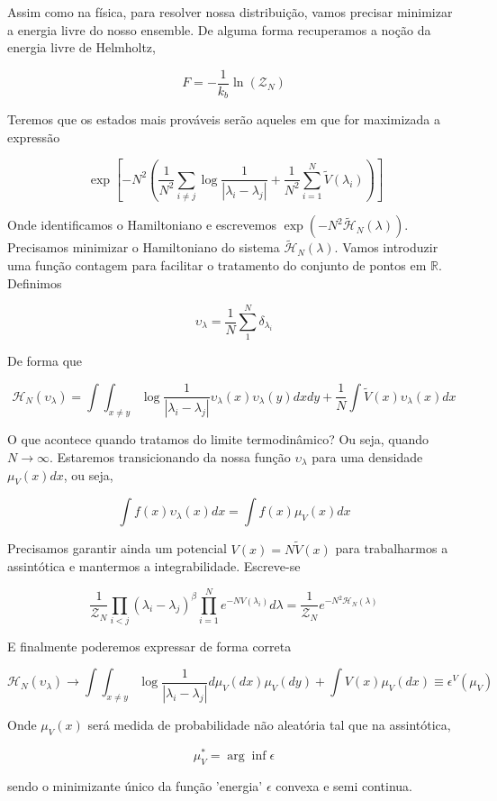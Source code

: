 Assim como na física, para resolver nossa distribuição, vamos precisar minimizar a energia livre do nosso ensemble. De alguma forma recuperamos a noção da energia livre de Helmholtz,

\[
F = -\frac{1}{k_b} \ln{(\mathcal{Z}_N)}
\]

Teremos que os estados mais prováveis serão aqueles em que for maximizada a expressão

\begin{equation}\
	\exp{\left[-N^2 \left( \frac{1}{N^2}\sum_{i\neq j}\log{\frac{1}{|\lambda_i - \lambda_j|}} + \frac{1}{N^2} \sum_{i=1}^{N} \tilde{V}(\lambda_i)  \right)\right]}
\end{equation}

Onde identificamos o Hamiltoniano e escrevemos $\exp{(-N^2\mathcal{\tilde{H}}_N(\lambda))}$. Precisamos minimizar o Hamiltoniano do sistema $\mathcal{\tilde{H}}_N(\lambda)$. Vamos introduzir uma função contagem para facilitar o tratamento do conjunto de pontos em $\mathbb{R}$. Definimos

\begin{equation}
	\upsilon_\lambda = \frac{1}{N} \sum_1^N \delta_{\lambda_i}
\end{equation}

De forma que

\begin{equation}
	\mathcal{H}_N(\upsilon_\lambda) = 	\int \int_{x\neq y} \log{\frac{1}{|\lambda_i - \lambda_j|}}  \upsilon_\lambda(x) \upsilon_\lambda(y) dx dy + \frac{1}{N} \int \tilde{V}(x) \upsilon_\lambda(x) dx
	\label{eq::CoulombGas:: hamilton}
\end{equation}

O que acontece quando tratamos do limite termodinâmico? Ou seja, quando $N\to\infty$. Estaremos transicionando da nossa função $\upsilon_\lambda$ para uma densidade $\mu_V(x) dx$, ou seja,

\[
\int f(x) \upsilon_\lambda(x) dx =  \int f(x) \mu_V(x) dx
\]

Precisamos garantir ainda um potencial $V(x) = 
N\tilde{V}(x)$ para trabalharmos a assintótica e mantermos a integrabilidade. Escreve-se

\[
\frac{1}{\mathcal{Z}_N} \prod_{i<j} (\lambda_i - \lambda_j)^\beta \prod_{i=1}^{N} e^{-NV(\lambda_i)} d\lambda = 	\frac{1}{\mathcal{Z}_N}  e^{-N^2 \mathcal{H}_N(\lambda)}
\]

E finalmente poderemos expressar de forma correta

\begin{equation}
	\mathcal{H}_N(\upsilon_\lambda) \to \int \int_{x\neq y} \log{\frac{1}{|\lambda_i - \lambda_j|}}  d\mu_V(dx) \mu_V(dy) + \int V(x) \mu_V(dx) \equiv \epsilon^V(\mu_V)
\end{equation}

Onde $\mu_V(x)$ será medida de probabilidade não aleatória tal que na assintótica,

\[
\mu_V^* = \arg \inf {\epsilon}
\]

sendo o minimizante único da função 'energia' $\epsilon$ convexa e semi continua.
